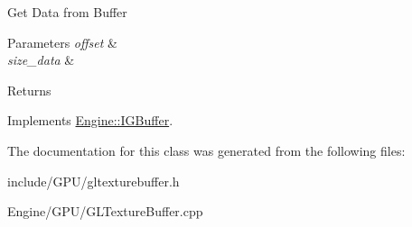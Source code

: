 Get Data from Buffer 
\begin{DoxyParams}{Parameters}
{\em offset} & \\
\hline
{\em size\+\_\+data} & \\
\hline
\end{DoxyParams}
\begin{DoxyReturn}{Returns}

\end{DoxyReturn}


Implements \hyperlink{classEngine_1_1IGBuffer_a8ad52dc670797d72aabf99033d20b220}{Engine\+::\+I\+G\+Buffer}.



The documentation for this class was generated from the following files\+:\begin{DoxyCompactItemize}
\item 
include/\+G\+P\+U/gltexturebuffer.\+h\item 
Engine/\+G\+P\+U/G\+L\+Texture\+Buffer.\+cpp\end{DoxyCompactItemize}
